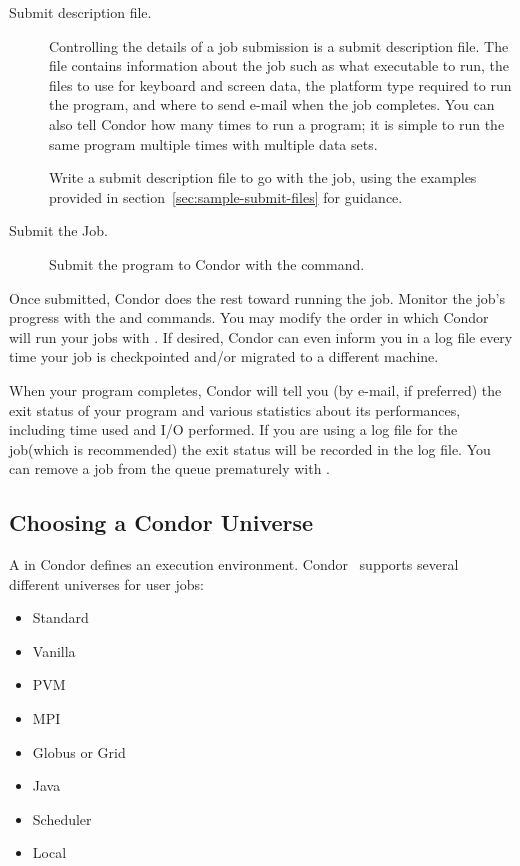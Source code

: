 \begin{description}
\item[Submit description file.]
Controlling the details of a job submission is a
submit description file.
The file contains information
about the job such as what executable to run, the
files to use for keyboard and screen data,
the platform type required to run the program, and
where to send e-mail when the job completes.
You can also tell Condor how many times to run a program;
it is simple to run the same program
multiple times with multiple data sets.

Write a submit description file to go with the job, using
the examples provided in section~\ref{sec:sample-submit-files}
for guidance.

\item[Submit the Job.]Submit the program to Condor with
the  command.

\end{description}

Once submitted, Condor does the rest toward running
the job.
Monitor the job's progress with the 
and  commands.
You may modify the order in which Condor will run your jobs with
. If desired, Condor can even inform you in a log file 
every time your job is checkpointed and/or migrated to a different machine. 

When your program completes, Condor will tell you
(by e-mail, if preferred) the exit status of your program and various
statistics about its performances, including time used and I/O performed.
If you are using a log file for the job(which is recommended) the exit
status will be recorded in the log file.
You can remove a job from the
queue prematurely with . 


\subsection{\label{sec:Choosing-Universe}
Choosing a Condor Universe}

A  in Condor
defines an execution environment. 
Condor \VersionNotice\ supports several different
universes for user jobs:
\begin{itemize}
	\item Standard
	\item Vanilla
	\item PVM
 	\item MPI
	\item Globus or Grid
	\item Java
	\item Scheduler
	\item Local
\end{itemize}

